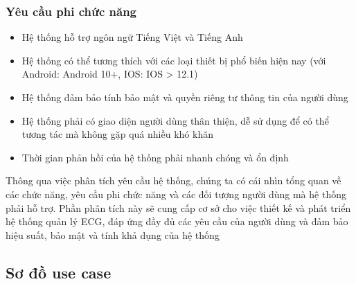 \subsubsection{Yêu cầu phi chức năng}
\begin{itemize}
    \item Hệ thống hỗ trợ ngôn ngữ Tiếng Việt và Tiếng Anh
    \item Hệ thống có thể tương thích với các loại thiết bị phổ biến hiện nay (với Android: Android 10+, IOS: IOS > 12.1)
    \item Hệ thống đảm bảo tính bảo mật và quyền riêng tư thông tin của người dùng
    \item Hệ thống phải có giao diện người dùng thân thiện, dễ sử dụng để có thể tương tác mà không gặp quá nhiều khó khăn
    \item Thời gian phản hồi của hệ thống phải nhanh chóng và ổn định
\end{itemize}

Thông qua việc phân tích yêu cầu hệ thống, chúng ta có cái nhìn tổng quan về các chức năng, yêu cầu phi chức năng và 
các đối tượng người dùng mà hệ thống phải hỗ trợ. Phần phân tích này sẽ cung cấp cơ sở cho việc thiết kế và phát triển hệ thống quản lý ECG, 
đáp ứng đầy đủ các yêu cầu của người dùng và đảm bảo hiệu suất, bảo mật và tính khả dụng của hệ thống

\subsection{Sơ đồ use case}
